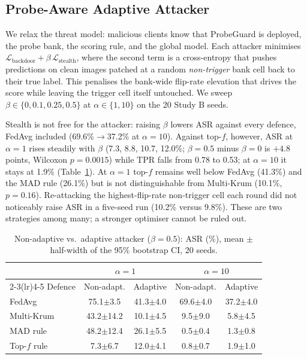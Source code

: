 \subsection{Probe-Aware Adaptive Attacker}\label{sec:adaptive}
We relax the threat model: malicious clients know that ProbeGuard is deployed, the probe bank, the scoring rule, and the global model. Each attacker minimises $\mathcal L_\text{backdoor}+\beta\,\mathcal L_\text{stealth}$, where the second term is a cross-entropy that pushes predictions on clean images patched at a random \emph{non-trigger} bank cell back to their true label. This penalises the bank-wide flip-rate elevation that drives the score while leaving the trigger cell itself untouched. We sweep $\beta\in\{0,0.1,0.25,0.5\}$ at $\alpha\in\{1,10\}$ on the 20 Study B seeds.

Stealth is not free for the attacker: raising $\beta$ lowers ASR against every defence, FedAvg included (69.6\%$\to$37.2\% at $\alpha=10$). Against top-$f$, however, ASR at $\alpha=1$ rises steadily with $\beta$ (7.3, 8.8, 10.7, 12.0\%; $\beta=0.5$ minus $\beta=0$ is $+4.8$ points, Wilcoxon $p=0.0015$) while TPR falls from 0.78 to 0.53; at $\alpha=10$ it stays at 1.9\% (Table~\ref{tab:adapt}). At $\alpha=1$ top-$f$ remains well below FedAvg (41.3\%) and the MAD rule (26.1\%) but is not distinguishable from Multi-Krum (10.1\%, $p=0.16$). Re-attacking the highest-flip-rate non-trigger cell each round did not noticeably raise ASR in a five-seed run (10.2\% versus 9.8\%). These are two strategies among many; a stronger optimiser cannot be ruled out.
\begin{table}[t]
\caption{Non-adaptive vs.\ adaptive attacker ($\beta{=}0.5$): ASR (\%), mean $\pm$ half-width of the 95\% bootstrap CI, 20 seeds.}
\label{tab:adapt}
\centering\footnotesize\setlength{\tabcolsep}{3pt}
\begin{tabular}{@{}lcccc@{}}
\toprule
 & \multicolumn{2}{c}{$\alpha=1$} & \multicolumn{2}{c}{$\alpha=10$}\\
\cmidrule(lr){2-3}\cmidrule(lr){4-5}
Defence & Non-adapt. & Adaptive & Non-adapt. & Adaptive\\
\midrule
FedAvg & 75.1$\pm$3.5 & 41.3$\pm$4.0 & 69.6$\pm$4.0 & 37.2$\pm$4.0\\
Multi-Krum & 43.2$\pm$14.2 & 10.1$\pm$4.5 & 9.5$\pm$9.0 & 5.8$\pm$4.5\\
MAD rule & 48.2$\pm$12.4 & 26.1$\pm$5.5 & 0.5$\pm$0.4 & 1.3$\pm$0.8\\
Top-$f$ rule & 7.3$\pm$6.7 & 12.0$\pm$4.1 & 0.8$\pm$0.7 & 1.9$\pm$1.0\\
\bottomrule
\end{tabular}
\end{table}

